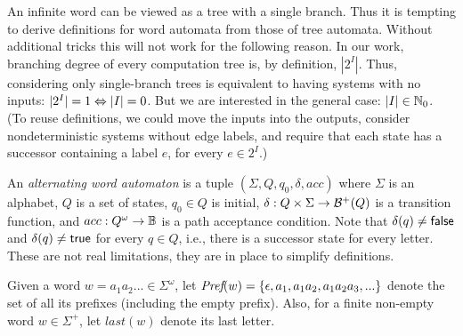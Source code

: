 %

\begin{remark}
An infinite word can be viewed as a tree with a single branch.
Thus it is tempting to derive definitions for word automata from those of tree automata.
Without additional tricks this will not work for the following reason.
In our work, branching degree of every computation tree is, by definition, $|2^I|$.
Thus, considering only single-branch trees is equivalent to
having systems with no inputs: $|2^I|=1 \Leftrightarrow |I|=0$.
But we are interested in the general case: $|I| \in \mathbb{N}_0$.
(To reuse definitions, we could move the inputs into the outputs,
 consider nondeterministic systems without edge labels,
 and require that each state has a successor containing a label $e$, for every $e \in 2^I$.)
\end{remark}

An \emph{alternating word automaton} is a tuple $(\Sigma, Q, q_0, \delta, acc)$
where $\Sigma$ is an alphabet, $Q$ is a set of states, $q_0 \in Q$ is initial,
$\delta: Q \times \Sigma \to {\cal B}^+(Q)$ is a transition function,
and $acc:Q^\omega \to \mathbb{B}$ is a path acceptance condition.
Note that $\delta(q) \neq \textsf{false}$ and $\delta(q) \neq \textsf{true}$ for every $q\in Q$,
i.e., there is a successor state for every letter.
These are not real limitations, they are in place to simplify definitions.

Given a word $w = a_1 a_2 ... \in \Sigma^\omega$,
let $\textit{Pref}(w) = \{\epsilon, a_1, a_1 a_2, a_1 a_2 a_3, ...\}$
denote the set of all its prefixes (including the empty prefix).
Also,
for a finite non-empty word $w \in \Sigma^+$,
let $last(w)$ denote its last letter.

